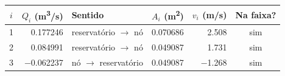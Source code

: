 \begin{tabular}{crlrrc}
\toprule
$i$ & $Q_i$ (\si{m^3/s}) & Sentido & $A_i$ (\si{m^2}) & $v_i$ (\si{m/s}) & Na faixa? \\
\midrule
1 & \num{0.177246} & reservat\'orio $\to$ n\'o & \num{0.070686} & \num{2.508} & sim \\
2 & \num{0.084991} & reservat\'orio $\to$ n\'o & \num{0.049087} & \num{1.731} & sim \\
3 & \num{-0.062237} & n\'o $\to$ reservat\'orio & \num{0.049087} & \num{-1.268} & sim \\
\bottomrule
\end{tabular}
